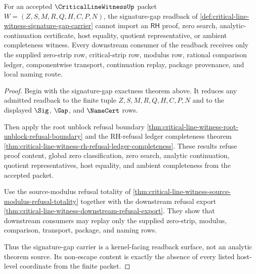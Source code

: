 \begin{theorem}
\label{thm:critical-line-witness-signature-gap-nonescape}
For an accepted $\CriticalLineWitnessUp$ packet $W=(Z,S,M,R,Q,H,C,P,N)$, the signature-gap readback of \autoref{def:critical-line-witness-signature-gap-carrier} cannot import an $\mathsf{RH}$ proof, zero search, analytic-continuation certificate, host equality, quotient representative, or ambient completeness witness. Every downstream consumer of the readback receives only the supplied zero-strip row, critical-strip row, modulus row, rational comparison ledger, componentwise transport, continuation replay, package provenance, and local naming route.
\end{theorem}
\begin{proof}
Begin with the signature-gap exactness theorem above. It reduces any admitted readback to the finite tuple $Z,S,M,R,Q,H,C,P,N$ and to the displayed $\Sig$, $\Gap$, and $\NameCert$ rows.

Then apply the root unblock refusal boundary \autoref{thm:critical-line-witness-root-unblock-refusal-boundary} and the RH-refusal ledger completeness theorem \autoref{thm:critical-line-witness-rh-refusal-ledger-completeness}. These results refuse proof content, global zero classification, zero search, analytic continuation, quotient representatives, host equality, and ambient completeness from the accepted packet.

Use the source-modulus refusal totality of \autoref{thm:critical-line-witness-source-modulus-refusal-totality} together with the downstream refusal export \autoref{thm:critical-line-witness-downstream-refusal-export}. They show that downstream consumers may replay only the supplied zero-strip, modulus, comparison, transport, package, and naming rows.

Thus the signature-gap carrier is a kernel-facing readback surface, not an analytic theorem source. Its non-escape content is exactly the absence of every listed host-level coordinate from the finite packet.
\end{proof}
